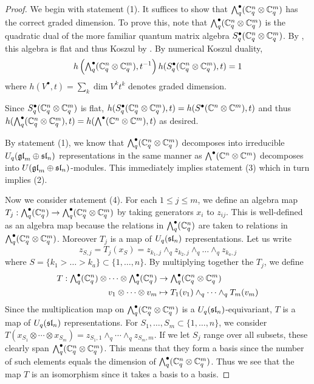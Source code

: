 \documentclass[11pt]{amsart}
\begin{document}
\begin{proof}
We begin with statement (1). It suffices to show that $ \Alt{\bullet}{q}(\bC_q^n \otimes \bC_q^m) $   has the correct graded dimension.  To prove this, note that $\Alt{\bullet}{q}(\bC_q^n \otimes \bC_q^m) $ is the quadratic dual of the more familiar quantum matrix algebra $ S_q^\bullet (\bC_q^n \otimes \bC_q^m) $.  By \cite[Prop. 2.38]{BZ}, this algebra is flat and thus Koszul by \cite[Prop. 2.33]{BZ}. By numerical Koszul duality,
$$ h\left(\Alt{\bullet}{q}( \bC_q^n \otimes \bC_q^m), t^{-1}\right) h(S^\bullet_q (\bC_q^n \otimes \bC_q^m), t) = 1 $$ 
where $ h(V^\bullet, t) = \sum_k \dim V^k t^k $ denotes graded dimension.
    
Since $ S^\bullet_q (\bC_q^n \otimes \bC_q^m) $ is flat, $ h(S^\bullet_q (\bC_q^n \otimes \bC_q^m), t) =  h(S^\bullet (\bC^n \otimes \bC^m), t) $ and thus  $ h(\Alt{\bullet}{q} (\bC_q^n \otimes \bC_q^m), t) =  h(\Alt{\bullet}{} (\bC^n \otimes \bC^m), t)$ as desired.
    
By statement (1), we know that $ \Alt{\bullet}{q}(\bC_q^n \otimes \bC_q^m) $ decomposes into irreducible $ U_q(\gl_m \oplus \sl_n) $ representations in the same manner as $ \Alt{\bullet}{}(\bC^n \otimes \bC^m) $ decomposes into $ U(\gl_m \oplus \sl_n)$-modules. This immediately implies statement (3) which in turn implies (2).

Now we consider statement (4). For each $ 1 \le j \le m$, we define an algebra map $T_j : \Alt{\bullet}{q}(\bC_q^n) \rightarrow \Alt{\bullet}{q} (\bC_q^n \otimes \bC_q^m) $ by taking generators $ x_i $ to $z_{ij}$.  This is well-defined as an algebra map because the relations in $ \Alt{\bullet}{q}(\bC_q^n) $ are taken to relations in $\Alt{\bullet}{q} (\bC_q^n \otimes \bC_q^m)$.  Moreover $T_j $ is a map of $ U_q(\sl_n) $ representations.  Let us write 
$$z_{S,j} = T_j(x_S) = z_{k_1,j} \wedge_q z_{k_2,j} \wedge_q \dots \wedge_q z_{k_a,j}$$ 
where $ S = \{k_1 > \dots > k_a \} \subset \{ 1, \dots, n \} $. By multiplying together the $ T_j $, we define
\begin{align*}
T : \Alt{\bullet}{q}(\bC_q^n) \otimes \cdots \otimes \Alt{\bullet}{q}(\bC_q^n) &\rightarrow \Alt{\bullet}{q} (\bC_q^n \otimes \bC_q^m) \\
v_1 \otimes \cdots \otimes v_m &\mapsto T_1(v_1) \wedge_q \cdots \wedge_q T_m(v_m)
\end{align*}
Since the multiplication map on $\Alt{\bullet}{q} (\bC_q^n \otimes \bC_q^m)  $ is a $U_q(\sl_n)$-equivariant, $ T $ is a map of $ U_q(\sl_n) $ representations. For $ S_1, \dots, S_m \subset \{1, \dots, n \} $, we consider $ T(x_{S_1} \otimes \cdots \otimes x_{S_m}) = z_{S_1,1} \wedge_q \cdots \wedge_q z_{S_m,m}$. If we let $ S_j $ range over all subsets, these clearly span $ \Alt{\bullet}{q} (\bC_q^n \otimes \bC_q^m) $.  This means that they form a basis since the number of such elements equals the dimension of $ \Alt{\bullet}{q} (\bC_q^n \otimes \bC_q^m) $.  Thus we see that the map $ T $ is an isomorphism since it takes a basis to a basis. 
\end{proof}
\end{document}
